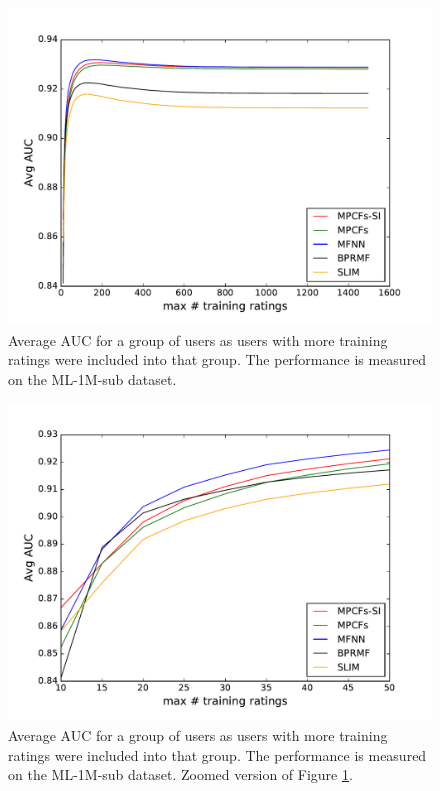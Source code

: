 \begin{figure}[p]
	\centering
	\includegraphics[width=0.7\linewidth]{./section-chapter2/figures/ml-1m_comparison_auc.pdf}
	\caption{
		Average AUC for a group of users as users with more training ratings were included into that group.
		The performance is measured on the ML-1M-sub dataset.}
	\label{f:ml-1m-comp-auc}
\end{figure}

\begin{figure}[p]
	\centering
	\includegraphics[width=0.7\linewidth]{./section-chapter2/figures/ml-1m_comparison_auc_zoom.pdf}
	\caption{Average AUC for a group of users as users with more training ratings were included into that group.
		The performance is measured on the ML-1M-sub dataset.
		Zoomed version of Figure \ref{f:ml-1m-comp-auc}.}
	\label{f:ml-1m-comp-auc-zoom}
\end{figure}

